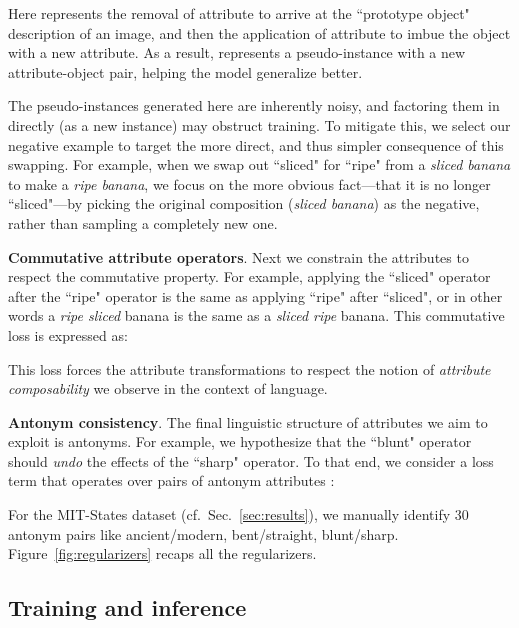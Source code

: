 \documentclass[runningheads]{llncs}
\begin{document}
Here  represents the removal of attribute  to arrive at the ``prototype object" description of an image, and then the application of attribute  to imbue the object with a new attribute. As a result,  represents a pseudo-instance with a new attribute-object pair, helping the model generalize better. 

The pseudo-instances generated here are inherently noisy, and factoring them in directly (as a new instance) may obstruct training. To mitigate this, we select our negative example to target the more direct, and thus simpler consequence of this swapping. For example, when we swap out ``sliced" for ``ripe" from a \emph{sliced banana} to make a \emph{ripe banana}, we focus on the more obvious fact---that it is no longer ``sliced"---by picking the original composition (\emph{sliced banana}) as the negative, rather than sampling a completely new one.

\vspace{0.05in}
\noindent\textbf{Commutative attribute operators}. 
Next we constrain the attributes to respect the commutative property.  For example,  applying the ``sliced" operator after the ``ripe" operator is the same as applying ``ripe" after ``sliced", or in other words a \emph{ripe sliced} banana is the same as a \emph{sliced ripe} banana.  This commutative loss is expressed as: 

This loss forces the attribute transformations to respect the notion of \emph{attribute composability} we observe in the context of language.



\vspace{0.05in}
\noindent\textbf{Antonym consistency}. 
The final linguistic structure of attributes we aim to exploit is antonyms. For example, we hypothesize that the ``blunt" operator should \emph{undo} the effects of the ``sharp" operator.  To that end, we consider a loss term that operates over pairs of antonym attributes :\vspace*{-0.1in}

For the MIT-States dataset (cf.~Sec.~\ref{sec:results}), we manually identify 30 antonym pairs like ancient/modern, bent/straight, blunt/sharp.
Figure~\ref{fig:regularizers} recaps all the regularizers.

\subsection{Training and inference} \label{sec:training_methodology}
\end{document}

